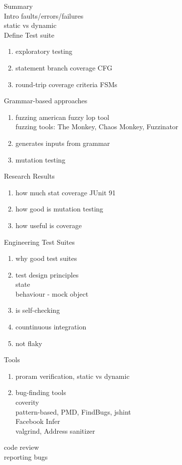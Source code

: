 \documentclass[10pt,usletter]{article}
\newcommand{\tab}[1][1cm]{\hspace*{#1}}
\begin{document}
Summary \\
Intro faults/errors/failures\\
static vs dynamic\\
Define Test suite\\
\begin{enumerate}
\item exploratory testing
\item statement branch coverage
\tab CFG
\item round-trip coverage criteria FSMs
\end{enumerate}
Grammar-based approaches
\begin{enumerate}
\item fuzzing  american fuzzy lop tool\\
\tab fuzzing tools: The Monkey, Chaos Monkey, Fuzzinator
\item generates inputs from grammar
\item mutation testing
\end{enumerate}
Research Results
\begin{enumerate}
\item how much stat coverage JUnit 91%
\item how good is mutation testing
\item how useful is coverage
\end{enumerate}
Engineering Test Suites
\begin{enumerate}
\item why good test suites
\item test design principles\\
\tab state\\
\tab behaviour - mock object
\item is self-checking
\item countinuous integration
\item not flaky
\end{enumerate}
Tools
\begin{enumerate}
\item proram verification, static vs dynamic
\item bug-finding tools\\
\tab coverity\\
\tab pattern-based, PMD, FindBugs, jshint\\
\tab Facebook Infer\\
\tab valgrind, Address sanitizer
\end{enumerate}
code review\\
reporting bugs
\end{document}
